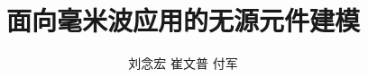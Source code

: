 \documentclass[UTF8,a4paper,zihao=-4]{ctexart}
\begin{document}
\tableofcontents
\title{面向毫米波应用的无源元件建模}
\author{刘念宏{} 崔文普{} 付军}
\date{}%
\maketitle





\end{document}

